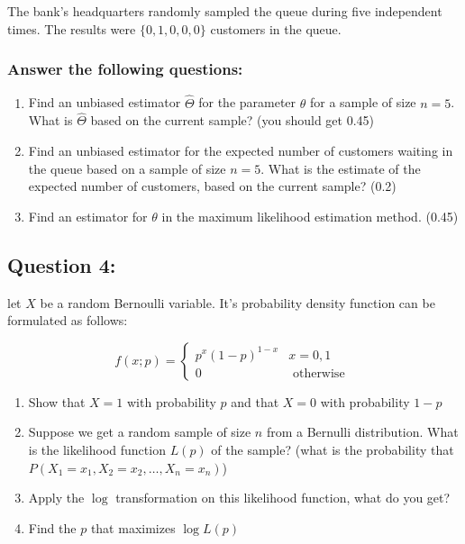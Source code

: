\documentclass[
]{article}
\providecommand{\tightlist}{%
  \setlength{\itemsep}{0pt}\setlength{\parskip}{0pt}}
\begin{document}
The bank's headquarters randomly sampled the queue during five
independent times. The results were \(\{0,1,0,0,0\}\) customers in the
queue.

\hypertarget{answer-the-following-questions}{%
\subsubsection{Answer the following
questions:}\label{answer-the-following-questions}}

\begin{enumerate}
\def\labelenumi{\arabic{enumi}.}
\tightlist
\item
  Find an unbiased estimator \(\hat{\Theta}\) for the parameter
  \(\theta\) for a sample of size \(n=5\). What is \(\hat{\Theta}\)
  based on the current sample? (you should get 0.45)
\item
  Find an unbiased estimator for the expected number of customers
  waiting in the queue based on a sample of size \(n=5\). What is the
  estimate of the expected number of customers, based on the current
  sample? (0.2)
\item
  Find an estimator for \(\theta\) in the maximum likelihood estimation
  method. (0.45)
\end{enumerate}

\hypertarget{question-4}{%
\subsection{Question 4:}\label{question-4}}

let \(X\) be a random Bernoulli variable. It's probability density
function can be formulated as follows:

\[
f(x ; p)=\left\{\begin{array}{ll}{p^{x}(1-p)^{1-x}} & {x=0,1} \\ {0} & {\text { otherwise }}\end{array}\right.
\]

\begin{enumerate}
\def\labelenumi{\arabic{enumi}.}
\tightlist
\item
  Show that \(X=1\) with probability \(p\) and that \(X=0\) with
  probability \(1-p\)
\item
  Suppose we get a random sample of size \(n\) from a Bernulli
  distribution. What is the likelihood function \(L(p)\) of the sample?
  (what is the probability that
  \(P\left(X_{1}=x_{1}, X_{2}=x_{2}, \ldots, X_{n}=x_{n}\right)\))
\item
  Apply the \(\log\) transformation on this likelihood function, what do
  you get?
\item
  Find the \(p\) that maximizes \(\log L(p)\)
\end{enumerate}
\end{document}

